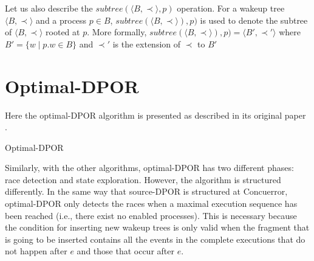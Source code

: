 Let us also describe the $subtree(\langle B , \prec \rangle, p)$ operation. For a wakeup tree $\langle B , \prec \rangle$
and a process  $p \in B$, $subtree(\langle B , \prec \rangle), p)$ is used to denote the
subtree of $\langle B , \prec \rangle$ rooted at $p$. More formally, $subtree(\langle B , \prec \rangle), p) 
= \langle B' , \prec' \rangle$ where $B' = \{w \mid p.w \in B \}$ and $\prec'$ is the extension of $\prec$ to $B'$

\section{Optimal-DPOR} 

Here the optimal-DPOR algorithm is presented as described in its original paper \cite{AbdullaAronisJohnssonSagonasDPOR2014}.

\begin{algorithm}
    \caption{Optimal-DPOR}
    \label{optimal}
\end{algorithm}

Similarly, with the other algorithms, optimal-DPOR has two different phases: race detection and state exploration. 
However, the algorithm is structured differently. In the same way that source-DPOR is structured at Concuerror,
optimal-DPOR only detects the races when a maximal execution sequence has been reached (i.e., there exist no
enabled processes). This is necessary because the condition for inserting new wakeup trees is only
valid when the fragment that is going to be inserted contains all the events in the complete executions that 
do not happen after $e$ and those that occur after $e$.

